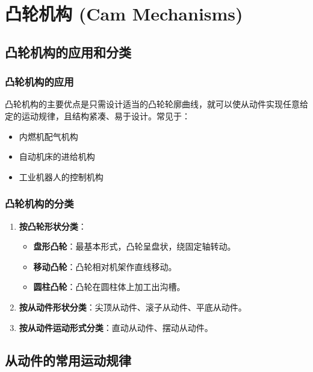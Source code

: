 \chapter{凸轮机构 (Cam Mechanisms)}


\section{凸轮机构的应用和分类}

\subsection{凸轮机构的应用}
凸轮机构的主要优点是只需设计适当的凸轮轮廓曲线，就可以使从动件实现任意给定的运动规律，且结构紧凑、易于设计。常见于：
\begin{itemize}
	\item 内燃机配气机构
	\item 自动机床的进给机构
	\item 工业机器人的控制机构
\end{itemize}

\subsection{凸轮机构的分类}

\begin{enumerate}
	\item \textbf{按凸轮形状分类}：
	\begin{itemize}
		\item \textbf{盘形凸轮}：最基本形式，凸轮呈盘状，绕固定轴转动。
		\item \textbf{移动凸轮}：凸轮相对机架作直线移动。
		\item \textbf{圆柱凸轮}：凸轮在圆柱体上加工出沟槽。
	\end{itemize}
	\item \textbf{按从动件形状分类}：尖顶从动件、滚子从动件、平底从动件。
	\item \textbf{按从动件运动形式分类}：直动从动件、摆动从动件。
\end{enumerate}

\section{从动件的常用运动规律}

